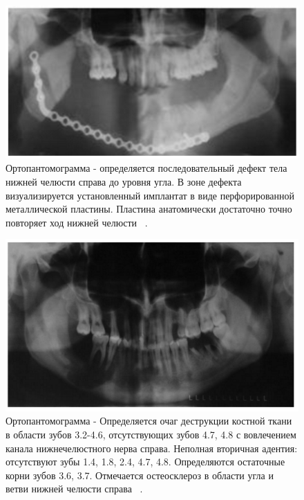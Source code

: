 \documentclass[11pt]{article}
\begin{document}
	\begin{figure}[H]
	\centering
	\includegraphics[width=\textwidth]{optg_5}
	\caption{Ортопантомограмма - определяется последовательный дефект тела нижней челюсти справа до уровня угла. В зоне дефекта визуализируется установленный имплантат в виде перфорированной металлической пластины. Пластина анатомически достаточно точно повторяет ход нижней челюсти ~\cite{rejr}. }
	\label{fig:optg_5}
	\end{figure}

	\begin{figure}[H]
	\centering
	\includegraphics[width=\textwidth]{optg_6}
	\caption{Ортопантомограмма - Определяется очаг деструкции костной ткани в области зубов 3.2-4.6, отсутствующих зубов 4.7, 4.8 с вовлечением канала нижнечелюстного нерва справа. Неполная вторичная адентия: отсутствуют зубы 1.4, 1.8, 2.4, 4.7, 4.8. Определяются остаточные корни зубов 3.6, 3.7. Отмечается остеосклероз в области угла и ветви нижней	челюсти справа ~\cite{rejr}. }
	\label{fig:optg_6}
	\end{figure}
\end{document}
